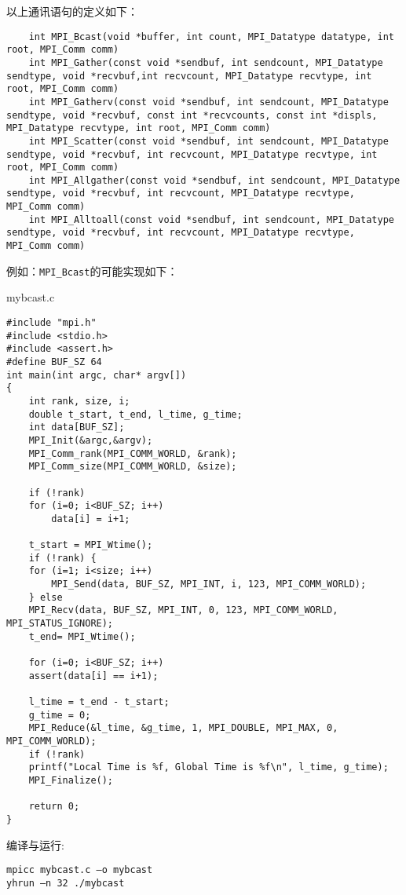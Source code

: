 \documentclass{ctexart}
\begin{document}
以上通讯语句的定义如下：

\begin{lstlisting}
    int MPI_Bcast(void *buffer, int count, MPI_Datatype datatype, int root, MPI_Comm comm)
    int MPI_Gather(const void *sendbuf, int sendcount, MPI_Datatype sendtype, void *recvbuf,int recvcount, MPI_Datatype recvtype, int root, MPI_Comm comm)
    int MPI_Gatherv(const void *sendbuf, int sendcount, MPI_Datatype sendtype, void *recvbuf, const int *recvcounts, const int *displs, MPI_Datatype recvtype, int root, MPI_Comm comm)
    int MPI_Scatter(const void *sendbuf, int sendcount, MPI_Datatype sendtype, void *recvbuf, int recvcount, MPI_Datatype recvtype, int root, MPI_Comm comm)
    int MPI_Allgather(const void *sendbuf, int sendcount, MPI_Datatype sendtype, void *recvbuf, int recvcount, MPI_Datatype recvtype, MPI_Comm comm)
    int MPI_Alltoall(const void *sendbuf, int sendcount, MPI_Datatype sendtype, void *recvbuf, int recvcount, MPI_Datatype recvtype, MPI_Comm comm)
\end{lstlisting}


例如：\lstinline{MPI_Bcast}的可能实现如下：

mybcast.c

\begin{lstlisting}
#include "mpi.h"
#include <stdio.h>
#include <assert.h>
#define BUF_SZ 64
int main(int argc, char* argv[])
{
    int rank, size, i;
    double t_start, t_end, l_time, g_time;
    int data[BUF_SZ];
    MPI_Init(&argc,&argv);
    MPI_Comm_rank(MPI_COMM_WORLD, &rank);
    MPI_Comm_size(MPI_COMM_WORLD, &size);

    if (!rank) 
    for (i=0; i<BUF_SZ; i++)
        data[i] = i+1;

    t_start = MPI_Wtime();
    if (!rank) {
    for (i=1; i<size; i++)
        MPI_Send(data, BUF_SZ, MPI_INT, i, 123, MPI_COMM_WORLD);
    } else 
    MPI_Recv(data, BUF_SZ, MPI_INT, 0, 123, MPI_COMM_WORLD, MPI_STATUS_IGNORE);
    t_end= MPI_Wtime();

    for (i=0; i<BUF_SZ; i++)
    assert(data[i] == i+1);

    l_time = t_end - t_start;
    g_time = 0;
    MPI_Reduce(&l_time, &g_time, 1, MPI_DOUBLE, MPI_MAX, 0, MPI_COMM_WORLD);
    if (!rank) 
    printf("Local Time is %f, Global Time is %f\n", l_time, g_time);
    MPI_Finalize();

    return 0;
}
\end{lstlisting}

编译与运行:
\begin{lstlisting}
mpicc mybcast.c –o mybcast
yhrun –n 32 ./mybcast
\end{lstlisting}
\end{document}
